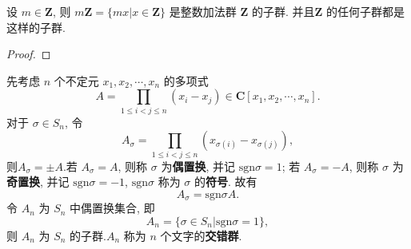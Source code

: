 \documentclass[../../main.tex]{subfiles}
\begin{document}
\begin{example}
设 \( m \in \mathbf{Z} \), 则 \( m\mathbf{Z} = \{mx|x \in \mathbf{Z}\} \) 是整数加法群 \( \mathbf{Z} \) 的子群. 并且\( \mathbf{Z} \) 的任何子群都是这样的子群.
\end{example}
\begin{proof}

\end{proof}

\begin{example}
先考虑 \( n \) 个不定元 \( x_1, x_2, \cdots, x_n \) 的多项式
\[
A = \prod_{1 \leqslant i < j \leqslant n} (x_i - x_j) \in \mathbf{C}[x_1, x_2, \cdots, x_n].
\]
对于 \( \sigma \in S_n \), 令
\[
A_\sigma = \prod_{1 \leqslant i < j \leqslant n} (x_{\sigma(i)} - x_{\sigma(j)}),
\]
则$A_{\sigma}=\pm A$.若 \( A_\sigma = A \), 则称 \( \sigma \) 为\textbf{偶置换}, 并记 \( \text{sgn}\sigma = 1 \); 若 \( A_\sigma = -A \), 则称 \( \sigma \) 为\textbf{奇置换}, 并记 \( \text{sgn}\sigma = -1 \), \( \text{sgn}\sigma \) 称为 \( \sigma \) 的\textbf{符号}. 故有
\[
A_\sigma = \text{sgn}\sigma A.
\]
令 \( A_n \) 为 \( S_n \) 中偶置换集合, 即
\[
A_n = \{\sigma \in S_n|\text{sgn}\sigma = 1\},
\]
则 \( A_n \) 为 \( S_n \) 的子群.\( A_n \) 称为 \( n \) 个文字的\textbf{交错群}.
\end{example}
\end{document}
